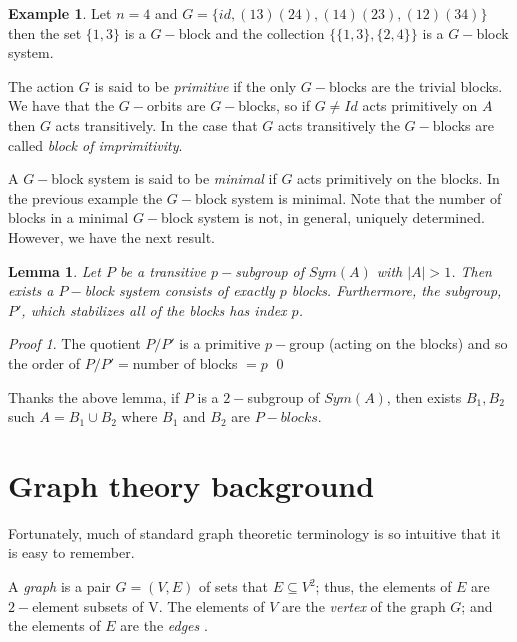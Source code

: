\documentclass[12pt,a4paper]{book}
\theoremstyle{plain}
\newtheorem{lema}{Lemma}
\theoremstyle{definition}
\newtheorem{example}{Example}
\theoremstyle{remark}
\newtheorem*{Proof}{Proof}
\begin{document}
\begin{example}
 Let $n=4$ and $G= \{ id, (13)(24),(14)(23),(12)(34) \}$ then the set $\{1,3\}$ is a $G-$block and the collection $\{ \{1,3\}, \{2,4\} \}$ is a
$G-$block system.
\end{example}

 The action $G$ is said to be \emph{primitive} if the only $G-$blocks are the trivial blocks. We have that the $G-$orbits are 
$G-$blocks, so if $G \neq Id$ acts primitively on $A$ then $G$ acts transitively. In the case that $G$ acts transitively the $G-$blocks are 
called \emph{block of imprimitivity}.




A $G-$block system is said to be \emph{minimal} if $G$ acts primitively on the blocks. In the previous example 
the $G-$block system is minimal. Note that the number of blocks in a minimal $G-$block system is not, in general, uniquely determined. However, 
we have the next result.


\begin{lema}\label{MinimalBlockSystemLema}
 Let $P$ be a transitive $p-$subgroup of $Sym(A)$ with $|A|>1$. Then exists a $P-$block system consists of exactly $p$ blocks. 
Furthermore, the subgroup, $P'$, which stabilizes all of the blocks has index $p$.
\end{lema}

\begin{Proof}
 The quotient $P/P'$ is a primitive $p-$group (acting on the blocks) and so the order of $P/P' = $number of blocks $= p$ 
\cite[p.~66]{hall1976theory}
\qed  \end{Proof}

Thanks the above lemma,  if $P$ is a $2-$subgroup of $Sym (A)$, then exists $B_1, B_2$ such 
$A= B_1 \cup B_2$ where $B_1 $ and $B_2$ are $P-blocks$.

\section{Graph theory background}

Fortunately, much of standard graph theoretic terminology is so intuitive that it is easy to remember.

 A \emph{graph} is a pair $G=(V,E)$ of sets that $E \subseteq V^2$; thus, the elements of $E$ are $2-$element subsets 
of V. The elements of $V$ are the \emph{vertex}  of the graph $G$; and the elements of $E$ are the \emph{edges} .
\end{document}
